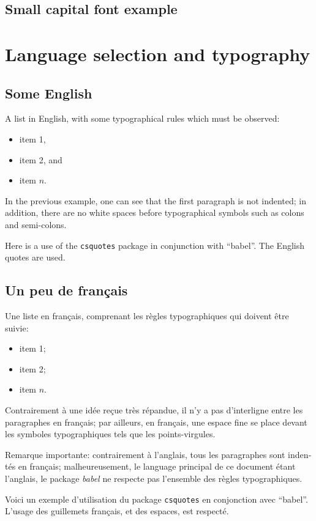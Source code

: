 \documentclass[11pt, a4paper, english]{report}
\begin{document}
	\textbf{\textit{\lipsum[1]}}
	
	
	\section{Small capital font example}
	
	\textsc{\lipsum[1]}
	

\chapter{Language selection and typography}

	
	\section{Some English}
	
		A list in English, with some typographical rules which must be observed:
		\begin{itemize}
			\item item 1,
			\item item 2, and
			\item item $n$.
		\end{itemize}
	
		In the previous example, one can see that the first paragraph is not indented; in addition, there are no white spaces before typographical symbols such as colons and semi-colons.
		
		Here is a use of the \texttt{csquotes} package in conjunction with \enquote{babel}. The English quotes are used. 


	\begin{otherlanguage}{french}%
	\section{Un peu de français}
	
		Une liste en français, comprenant les règles typographiques qui doivent être suivie:
		\begin{itemize}
			\item item 1;
			\item item 2;
			\item item $n$.
		\end{itemize}
		
		Contrairement à une idée reçue très répandue, il n'y a pas d'interligne entre les paragraphes en français; par ailleurs, en français, une espace fine se place devant les symboles typographiques tels que les points-virgules.
		
		Remarque importante: contrairement à l'anglais, tous les paragraphes sont indentés en français; malheureusement, le language principal de ce document étant l'anglais, le package \textit{babel} ne respecte pas l'ensemble des règles typographiques.
		
		Voici un exemple d'utilisation du package \texttt{csquotes} en conjonction avec \enquote{babel}. L'usage des guillemets français, et des espaces, est respecté.
	\end{otherlanguage}
		

	
	
\end{document}
